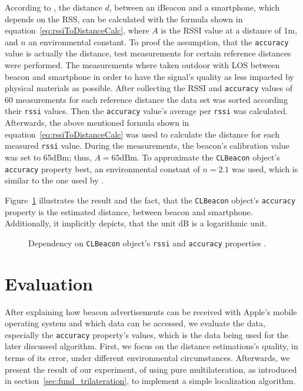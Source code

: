 According to \citet{wang:bt_pos}, the distance $d$, between an iBeacon and a smartphone, which depends on the \acl{RSS}, can be calculated with the formula shown in equation~\ref{eq:rssiToDistanceCalc}, where $A$ is the \acs{RSSI} value at a distance of 1m, and $n$ an environmental constant. To proof the assumption, that the \texttt{accuracy} value is actually the distance, test measurements for certain reference distances were performed. The measurements where taken outdoor with \ac{LOS} between beacon and smartphone in order to have the signal's quality as less impacted by physical materials as possible. After collecting the \acs{RSSI} and \texttt{accuracy} values of 60 measurements for each reference distance the data set was sorted according their \texttt{rssi} values. Then the \texttt{accuracy} value's average per \texttt{rssi} was calculated. Afterwards, the above mentioned formula shown in equation~\ref{eq:rssiToDistanceCalc} was used to calculate the distance for each measured \texttt{rssi} value. During the measurements, the beacon's calibration value was set to 65dBm; thus, $A = 65\text{dBm}$. To approximate the \texttt{CLBeacon} object's \texttt{accuracy} property best, an environmental constant of $n = 2.1$ was used, which is similar to the one used by \citet{wang:bt_pos}.

Figure~\ref{fig:eval_accuracy_vs_distance} illustrates the result and the fact, that the \texttt{CLBeacon} object's \texttt{accuracy} property is the estimated distance, between beacon and smartphone. Additionally, it implicitly depicts, that the unit dB is a logarithmic unit.

\begin{figure}
  
	\caption{Dependency on \texttt{CLBeacon} object's \texttt{rssi} and \texttt{accuracy} properties \citep{apple:ios_doc_cl,wang:bt_pos,kotanen:exp_local_pos_bt}.}
	\label{fig:eval_accuracy_vs_distance}
\end{figure}



\section{Evaluation}\label{sec:beacon_eval}
After explaining how beacon advertisements can be received with Apple's mobile operating system and which data can be accessed, we evaluate the data, especially the \texttt{accuracy} property's values, which is the data being used for the later discussed algorithm. First, we focus on the distance estimations's quality, in terms of its error, under different environmental circumstances. Afterwards, we present the result of our experiment, of using pure multilateration, as introduced in section~\ref{sec:fund_trilateration}, to implement a simple localization algorithm.

